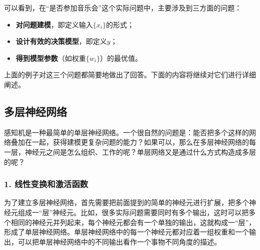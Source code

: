 \parinterval 可以看到，在“是否参加音乐会”这个实际问题中，主要涉及到三方面的问题：

\begin{itemize}
\vspace{0.5em}
\item {\small\sffamily\bfseries{对问题建模}}，即定义输入$ \{x_i\} $的形式；
\vspace{0.5em}
\item {\small\sffamily\bfseries{设计有效的决策模型}}，即定义$ y $；
\vspace{0.5em}
\item {\small\sffamily\bfseries{得到模型参数}}（如权重$ \{w_i\} $）的最优值。
\vspace{0.5em}
\end{itemize}

\parinterval 上面的例子对这三个问题都简要地做出了回答。下面的内容将继续对它们进行详细阐述。


\subsection{多层神经网络}

\parinterval 感知机是一种最简单的单层神经网络。一个很自然的问题是：能否把多个这样的网络叠加在一起，获得建模更复杂问题的能力？如果可以，那么在多层神经网络的每一层，神经元之间是怎么组织、工作的呢？单层网络又是通过什么方式构造成多层的呢？


\subsubsection{1. 线性变换和激活函数}

\parinterval 为了建立多层神经网络，首先需要把前面提到的简单的神经元进行扩展，把多个神经元组成一“层”神经元。比如，很多实际问题需要同时有多个输出，这时可以把多个相同的神经元并列起来，每个神经元都会有一个单独的输出，这就构成一“层”，形成了单层神经网络。单层神经网络中的每一个神经元都对应着一组权重和一个输出，可以把单层神经网络中的不同输出看作一个事物不同角度的描述。


